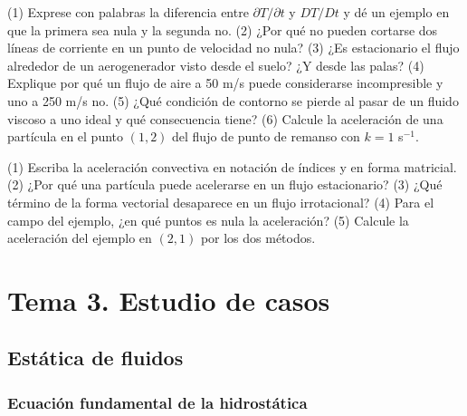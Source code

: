 \documentclass[10pt,openany]{book}
\begin{document}
\begin{tcolorbox}[title={Autoevaluación}, studiumcheck, breakable]

(1) Exprese con palabras la diferencia entre \(\partial T/\partial t\) y \(DT/Dt\) y dé un ejemplo en que la primera sea nula y la segunda no. (2) ¿Por qué no pueden cortarse dos líneas de corriente en un punto de velocidad no nula? (3) ¿Es estacionario el flujo alrededor de un aerogenerador visto desde el suelo? ¿Y desde las palas? (4) Explique por qué un flujo de aire a 50 m/s puede considerarse incompresible y uno a 250 m/s no. (5) ¿Qué condición de contorno se pierde al pasar de un fluido viscoso a uno ideal y qué consecuencia tiene? (6) Calcule la aceleración de una partícula en el punto \((1, 2)\) del flujo de punto de remanso con \(k = 1\) s\(^{-1}\).

(1) Escriba la aceleración convectiva en notación de índices y en forma matricial. (2) ¿Por qué una partícula puede acelerarse en un flujo estacionario? (3) ¿Qué término de la forma vectorial desaparece en un flujo irrotacional? (4) Para el campo del ejemplo, ¿en qué puntos es nula la aceleración? (5) Calcule la aceleración del ejemplo en \((2, 1)\) por los dos métodos.
\end{tcolorbox}
\studiumchaptercheck

\part{Tema 3. Estudio de casos}

\chapter{Estática de fluidos}
\label{chap:c05}


\section{Ecuación fundamental de la hidrostática}
\end{document}
